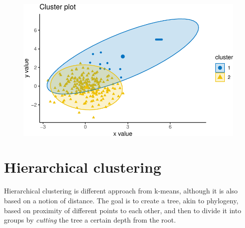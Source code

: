 \documentclass[
  letterpaper,
  DIV=11,
  numbers=noendperiod]{scrreprt}
\newenvironment{Shaded}{\begin{snugshade}}{\end{snugshade}}
\newcommand{\AttributeTok}[1]{\textcolor[rgb]{0.40,0.45,0.13}{#1}}
\newcommand{\ConstantTok}[1]{\textcolor[rgb]{0.56,0.35,0.01}{#1}}
\newcommand{\DecValTok}[1]{\textcolor[rgb]{0.68,0.00,0.00}{#1}}
\newcommand{\FunctionTok}[1]{\textcolor[rgb]{0.28,0.35,0.67}{#1}}
\newcommand{\NormalTok}[1]{\textcolor[rgb]{0.00,0.23,0.31}{#1}}
\newcommand{\OtherTok}[1]{\textcolor[rgb]{0.00,0.23,0.31}{#1}}
\newcommand{\SpecialCharTok}[1]{\textcolor[rgb]{0.37,0.37,0.37}{#1}}
\newcommand{\StringTok}[1]{\textcolor[rgb]{0.13,0.47,0.30}{#1}}
\begin{document}
\begin{Shaded}
\end{Shaded}

\begin{figure}[H]

{\centering \includegraphics{./12-clustering_files/figure-pdf/unnamed-chunk-7-1.pdf}

}

\end{figure}

\hypertarget{hierarchical-clustering}{%
\section{Hierarchical clustering}\label{hierarchical-clustering}}

Hierarchical clustering is different approach from k-means, although it
is also based on a notion of distance. The goal is to create a tree,
akin to phylogeny, based on proximity of different points to each other,
and then to divide it into groups by \emph{cutting} the tree a certain
depth from the root.
\end{document}
